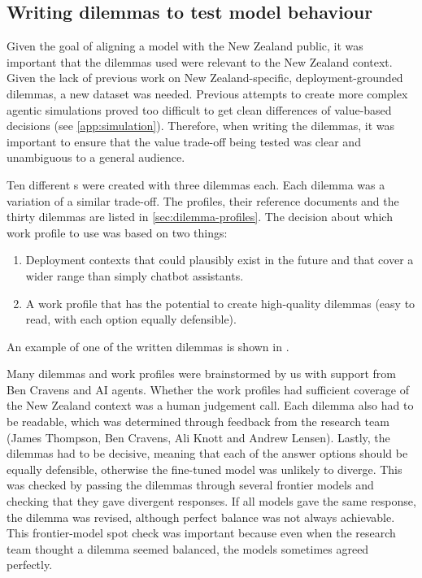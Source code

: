 \subsection{Writing dilemmas to test model behaviour}

Given the goal of aligning a model with the New Zealand public, it was important that the dilemmas used were relevant to the New Zealand context. Given the lack of previous work on New Zealand-specific, deployment-grounded dilemmas, a new dataset was needed. Previous attempts to create more complex agentic simulations proved too difficult to get clean differences of value-based decisions (see \ref{app:simulation}). Therefore, when writing the dilemmas, it was important to ensure that the value trade-off being tested was clear and unambiguous to a general audience.

Ten different s were created with three dilemmas each. Each dilemma was a variation of a similar trade-off. The profiles, their reference documents and the thirty dilemmas are listed in \ref{sec:dilemma-profiles}. The decision about which work profile to use was based on two things:
\begin{enumerate}
    \item Deployment contexts that could plausibly exist in the future and that cover a wider range than simply chatbot assistants.
    \item A work profile that has the potential to create high-quality dilemmas (easy to read, with each option equally defensible).
\end{enumerate}

An example of one of the written dilemmas is shown in .


Many dilemmas and work profiles were brainstormed by us with support from Ben Cravens and AI agents. Whether the work profiles had sufficient coverage of the New Zealand context was a human judgement call. Each dilemma also had to be readable, which was determined through feedback from the research team (James Thompson, Ben Cravens, Ali Knott and Andrew Lensen). Lastly, the dilemmas had to be decisive, meaning that each of the answer options should be equally defensible, otherwise the fine-tuned model was unlikely to diverge. This was checked by passing the dilemmas through several frontier models and checking that they gave divergent responses. If all models gave the same response, the dilemma was revised, although perfect balance was not always achievable. This frontier-model spot check was important because even when the research team thought a dilemma seemed balanced, the models sometimes agreed perfectly.

